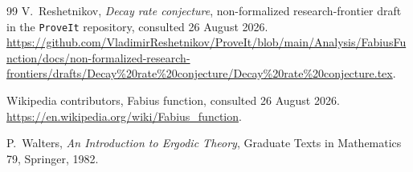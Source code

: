 \documentclass[11pt,oneside]{article}
\theoremstyle{definition}
\theoremstyle{remark}
\begin{document}
\begin{thebibliography}{99}
V.~Reshetnikov,
\newblock \emph{Decay rate conjecture},
\newblock non-formalized research-frontier draft in the \texttt{ProveIt}
repository, consulted 26 August 2026.
\newblock \url{https://github.com/VladimirReshetnikov/ProveIt/blob/main/Analysis/FabiusFunction/docs/non-formalized-research-frontiers/drafts/Decay%20rate%20conjecture/Decay%20rate%20conjecture.tex}.

Wikipedia contributors,
\newblock Fabius function,
\newblock consulted 26 August 2026.
\newblock \url{https://en.wikipedia.org/wiki/Fabius_function}.

P.~Walters,
\newblock \emph{An Introduction to Ergodic Theory},
\newblock Graduate Texts in Mathematics 79, Springer, 1982.

\end{thebibliography}
\end{document}
